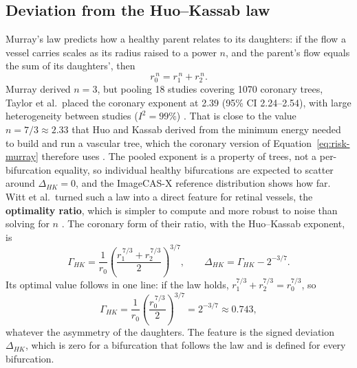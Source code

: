 \subsection{Deviation from the Huo--Kassab law}

Murray's law predicts how a healthy parent relates to its daughters: if the flow a vessel carries scales as its radius raised to a power $n$, and the parent's flow equals the sum of its daughters', then
\begin{equation}
  r_0^{\,n} = r_1^{\,n} + r_2^{\,n}.
  \label{eq:risk-murray}
\end{equation}
Murray derived $n = 3$, but pooling 18 studies covering 1070 coronary trees, Taylor et al.\ placed the coronary exponent at 2.39 (95\% CI 2.24--2.54), with large heterogeneity between studies ($I^2 = 99\%$) \cite{taylor2024murray}.
That is close to the value $n = 7/3 \approx 2.33$ that Huo and Kassab derived from the minimum energy needed to build and run a vascular tree, which the coronary version of Equation~\ref{eq:risk-murray} therefore uses \cite{huo2012scaling}.
The pooled exponent is a property of trees, not a per-bifurcation equality, so individual healthy bifurcations are expected to scatter around $\Delta_{HK} = 0$, and the ImageCAS-X reference distribution shows how far.
Witt et al.\ turned such a law into a direct feature for retinal vessels, the \textbf{optimality ratio}, which is simpler to compute and more robust to noise than solving for $n$ \cite{witt2010optimality}.
The coronary form of their ratio, with the Huo--Kassab exponent, is
\begin{equation}
  \Gamma_{HK} = \frac{1}{r_0}\left(\frac{r_1^{\,7/3} + r_2^{\,7/3}}{2}\right)^{3/7},
  \qquad
  \Delta_{HK} = \Gamma_{HK} - 2^{-3/7}.
  \label{eq:risk-gamma}
\end{equation}
Its optimal value follows in one line: if the law holds, $r_1^{7/3} + r_2^{7/3} = r_0^{7/3}$, so
\begin{equation*}
  \Gamma_{HK} = \frac{1}{r_0}\left(\frac{r_0^{\,7/3}}{2}\right)^{3/7} = 2^{-3/7} \approx 0.743,
\end{equation*}
whatever the asymmetry of the daughters.
The feature is the signed deviation $\Delta_{HK}$, which is zero for a bifurcation that follows the law and is defined for every bifurcation.

